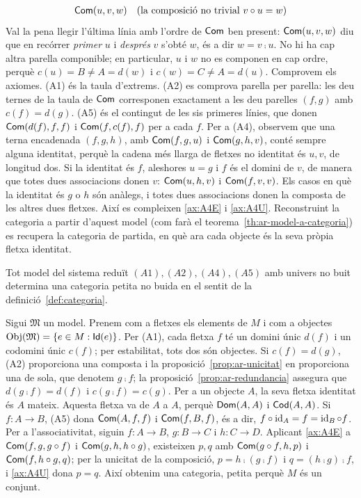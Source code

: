 \begin{exemple}
\[\begin{array}{ll}
\mathsf{Com}(u,v,w) & (\text{la composició no trivial }v\circ u=w)
\end{array}
\]
Val la pena llegir l'última línia amb l'ordre de $\mathsf{Com}$ ben present: $\mathsf{Com}(u,v,w)$ diu que en recórrer \emph{primer} $u$ i \emph{després} $v$ s'obté $w$, és a dir $w=v\comp u$. No hi ha cap altra parella componible; en particular, $u$ i $w$ no es componen en cap ordre, perquè $c(u)=B\neq A=d(w)$ i $c(w)=C\neq A=d(u)$. Comprovem els axiomes. (A1) és la taula d'extrems. (A2) es comprova parella per parella: les deu ternes de la taula de $\mathsf{Com}$ corresponen exactament a les deu parelles $(f,g)$ amb $c(f)=d(g)$. (A5) és el contingut de les sis primeres línies, que donen $\mathsf{Com}(d(f),f,f)$ i $\mathsf{Com}(f,c(f),f)$ per a cada $f$. Per a (A4), observem que una terna encadenada $(f,g,h)$, amb $\mathsf{Com}(f,g,u)$ i $\mathsf{Com}(g,h,v)$, conté sempre alguna identitat, perquè la cadena més llarga de fletxes no identitat és $u,v$, de longitud dos. Si la identitat és $f$, aleshores $u=g$ i $f$ és el domini de $v$, de manera que totes dues associacions donen $v$: $\mathsf{Com}(u,h,v)$ i $\mathsf{Com}(f,v,v)$. Els casos en què la identitat és $g$ o $h$ són anàlegs, i totes dues associacions donen la composta de les altres dues fletxes. Així es compleixen \eqref{ax:A4E} i \eqref{ax:A4U}. Reconstruint la categoria a partir d'aquest model (com farà el teorema~\ref{th:ar-model-a-categoria}) es recupera la categoria de partida, en què ara cada objecte és la seva pròpia fletxa identitat.
\end{exemple}

\begin{teorema}
\label{th:ar-model-a-categoria}
Tot model del sistema reduït $(A1),(A2),(A4),(A5)$ amb univers no buit determina una categoria petita no buida en el sentit de la definició~\ref{def:categoria}.
\end{teorema}

\begin{prova}
Sigui $\mathfrak M$ un model. Prenem com a fletxes els elements de $M$ i com a objectes $\operatorname{Obj}(\mathfrak M)=\{e\in M:\mathsf{Id}(e)\}$. Per (A1), cada fletxa $f$ té un domini únic $d(f)$ i un codomini únic $c(f)$; per estabilitat, tots dos són objectes. Si $c(f)=d(g)$, (A2) proporciona una composta i la proposició~\ref{prop:ar-unicitat} en proporciona una de sola, que denotem $g\comp f$; la proposició~\ref{prop:ar-redundancia} assegura que $d(g\comp f)=d(f)$ i $c(g\comp f)=c(g)$. Per a un objecte $A$, la seva fletxa identitat és $A$ mateix. Aquesta fletxa va de $A$ a $A$, perquè $\mathsf{Dom}(A,A)$ i $\mathsf{Cod}(A,A)$. Si $f\colon A\to B$, (A5) dona $\mathsf{Com}(A,f,f)$ i $\mathsf{Com}(f,B,f)$, és a dir, $f\circ\operatorname{id}_A=f=\operatorname{id}_B\circ f$. Per a l'associativitat, siguin $f\colon A\to B$, $g\colon B\to C$ i $h\colon C\to D$. Aplicant \eqref{ax:A4E} a $\mathsf{Com}(f,g,g\circ f)$ i $\mathsf{Com}(g,h,h\circ g)$, existeixen $p,q$ amb $\mathsf{Com}(g\circ f,h,p)$ i $\mathsf{Com}(f,h\circ g,q)$; per la unicitat de la composició, $p=h\comp(g\comp f)$ i $q=(h\comp g)\comp f$, i \eqref{ax:A4U} dona $p=q$. Així obtenim una categoria, petita perquè $M$ és un conjunt.
\end{prova}

